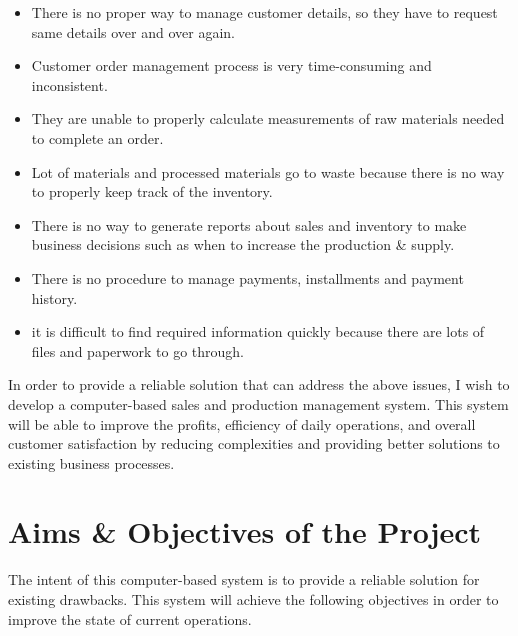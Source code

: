 \documentclass[12pt]{report}
\begin{document}
\begin{itemize}
	\item There is no proper way to manage customer details, so they have to request same details over and over again.
	\item Customer order management process is very time-consuming and inconsistent.
	\item They are unable to properly calculate measurements of raw materials needed to complete an order.
	\item Lot of materials and processed materials go to waste because there is no way to properly keep track of the inventory.
	\item There is no way to generate reports about sales and inventory to make business decisions such as when to increase the production \& supply.
	\item There is no procedure to manage payments, installments and payment history.
	\item it is difficult to find required information quickly because there are lots of files and paperwork to go through.
\end{itemize}

In order to provide a reliable solution that can address the above issues, I wish to develop a computer-based sales and production management system. This system will be able to improve the profits, efficiency of daily operations, and overall customer satisfaction by reducing complexities and providing better solutions to existing business processes.


\section{Aims \& Objectives of the Project}

The intent of this computer-based system is to provide a reliable solution for existing drawbacks.  This system will achieve the following objectives in order to improve the state of current operations.
\end{document}
